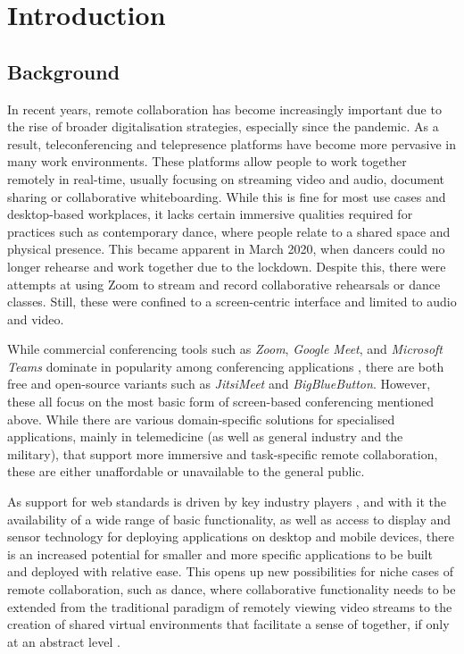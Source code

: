 \chapter{Introduction}
\label{chapter:introduction}

\section{Background}

In recent years, remote collaboration has become increasingly important due to the rise of broader digitalisation strategies, especially since the pandemic. As a result, teleconferencing and telepresence platforms have become more pervasive in many work environments. These platforms allow people to work together remotely in real-time, usually focusing on streaming video and audio, document sharing or collaborative whiteboarding. While this is fine for most use cases and desktop-based workplaces, it lacks certain immersive qualities required for practices such as contemporary dance, where people relate to a shared space and physical presence. This became apparent in March 2020, when dancers could no longer rehearse and work together due to the lockdown. Despite this, there were attempts at using Zoom to stream and record collaborative rehearsals or dance classes. Still, these were confined to a screen-centric interface and limited to audio and video.

While commercial conferencing tools such as \emph{Zoom}, \emph{Google Meet}, and \emph{Microsoft Teams} dominate in popularity among conferencing applications \parencite{mostPopularConferencingPlatforms}, there are both free and open-source variants such as \emph{JitsiMeet} and \emph{BigBlueButton}. However, these all focus on the most basic form of screen-based conferencing mentioned above. While there are various domain-specific solutions for specialised applications, mainly in telemedicine (as well as general industry and the military), that support more immersive and task-specific remote collaboration, these are either unaffordable or unavailable to the general public.

As support for web standards is driven by key industry players \parencite{pushingInteroperabilityForward}, and with it the availability of a wide range of basic functionality, as well as access to display and sensor technology for deploying applications on desktop and mobile devices, there is an increased potential for smaller and more specific applications to be built and deployed with relative ease. This opens up new possibilities for niche cases of remote collaboration, such as dance, where collaborative functionality needs to be extended from the traditional paradigm of remotely viewing video streams to the creation of shared virtual environments that facilitate a sense of  together, if only at an abstract level \parencite{surveyOfPresence}.

